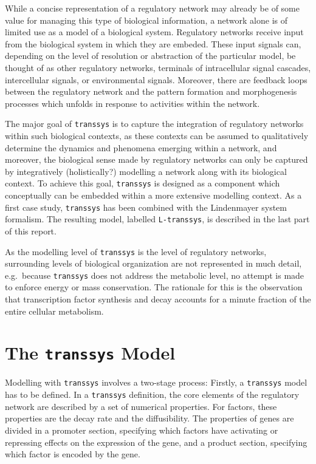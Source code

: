 \documentclass[12pt]{article}
\newcommand{\transsys}{\texttt{transsys}}
\newcommand{\ltranssys}{\texttt{L-}\transsys}
\begin{document}
While a concise representation of a regulatory network may already be
of some value for managing this type of biological information, a
network alone is of limited use as a model of a biological system.
Regulatory networks receive input from the biological system in which
they are embeded. These input signals can, depending on the level of
resolution or abstraction of the particular model, be thought of as
other regulatory networks, terminals of intracellular signal cascades,
intercellular signals, or environmental signals. Moreover, there are
feedback loops between the regulatory network and the pattern
formation and morphogenesis processes which unfolds in response to
activities within the network.

The major goal of \transsys{} is to capture the integration of
regulatory networks within such biological contexts, as these contexts
can be assumed to qualitatively determine the dynamics and phenomena
emerging within a network, and moreover, the biological sense made by
regulatory networks can only be captured by integratively
(holistically?) modelling a network along with its biological
context. To achieve this goal, \transsys{} is designed as a
component which conceptually can be embedded within a more extensive
modelling context. As a first case study, \transsys{} has been
combined with the Lindenmayer system formalism. The resulting model,
labelled \ltranssys{}, is described in the last part of this report.

As the modelling level of \transsys{} is the level of regulatory
networks, surrounding levels of biological organization are not
represented in much detail, e.g.\ because \transsys{} does not address
the metabolic level, no attempt is made to enforce energy or mass
conservation. The rationale for this is the observation that
transcription factor synthesis and decay accounts for a minute
fraction of the entire cellular metabolism.


\section{The \transsys{} Model}

Modelling with \transsys{} involves a two-stage process: Firstly, a
\transsys{} model has to be defined. In a \transsys{} definition, the
core elements of the regulatory network are described by a set of
numerical properties. For factors, these properties are the decay rate
and the diffusibility. The properties of genes are divided in a
promoter section, specifying which factors have activating or
repressing effects on the expression of the gene, and a product
section, specifying which factor is encoded by the gene.
\end{document}
